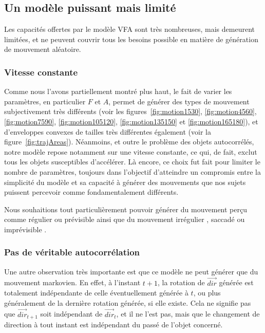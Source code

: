    \FloatBarrier \subsection{Un modèle puissant mais limité}
	Les capacités offertes par le modèle VFA sont très nombreuses, mais demeurent limitées, et ne peuvent couvrir tous les besoins possible en matière de génération de mouvement aléatoire.
    
    \FloatBarrier \subsubsection{Vitesse constante}
    Comme nous l'avons partiellement montré plus haut, le fait de varier les paramètres, en particulier $F$ et $A$, permet de générer des types de mouvement subjectivement très différents (voir les figures~\ref{fig:motion1530}, \ref{fig:motion4560}, \ref{fig:motion7590}, \ref{fig:motion105120}, \ref{fig:motion135150} et \ref{fig:motion165180}), et d'enveloppes convexes de tailles très différentes également (voir la figure~\ref{fig:trajAreas}). Néanmoins, et outre le problème des objets autocorrélés, notre modèle repose notamment sur une vitesse constante, ce qui, de fait, exclut tous les objets susceptibles d'accélérer. Là encore, ce choix fut fait pour limiter le nombre de paramètres, toujours dans l'objectif d'atteindre un compromis entre la simplicité du modèle et sa capacité à générer des mouvements que nos sujets puissent percevoir comme fondamentalement différents.
    
	Nous souhaitions tout particulièrement pouvoir générer du mouvement perçu comme \og régulier \fg{} ou \og prévisible \fg{} ainsi que du mouvement \og irrégulier \fg{}, \og saccadé \fg{} ou \og imprévisible \fg{}.
    
	\FloatBarrier \subsubsection{Pas de véritable autocorrélation}
	Une autre observation très importante est que ce modèle ne peut générer que du mouvement markovien. En effet, à l'instant $t+1$, la rotation de $\vec{dir}$ générée est totalement indépendante de celle éventuellement générée à $t$, ou plus généralement de la dernière rotation générée, si elle existe. Cela ne signifie pas que $\vec{dir}_{t+1}$ soit indépendant de $\vec{dir}_{t}$, et il ne l'est pas, mais que le changement de direction à tout instant est indépendant du passé de l'objet concerné.
    

